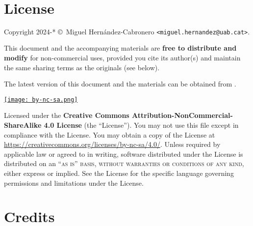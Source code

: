 
\newpage
~\vfill
\thispagestyle{empty}

\section*{License}

\noindent Copyright 2024-* \copyright\ Miguel Hernández-Cabronero \texttt{<miguel.hernandez@uab.cat>}.

\noindent This document and the accompanying materials are \textbf{free to distribute and modify} for non-commercial uses, 
provided you cite its author(s) and maintain the same sharing terms as the originals (see below).

\noindent The latest version of this document and the materials can be obtained from .

\begin{center}
\noindent\href{https://creativecommons.org/licenses/by-nc-sa/4.0/}{\texttt{[image: by-nc-sa.png]}}
\end{center}

\noindent Licensed under the \textbf{Creative Commons Attribution-NonCommercial-ShareAlike 4.0 License} (the ``License''). You may not use this file except in compliance with the License. You may obtain a copy of the License at \url{https://creativecommons.org/licenses/by-nc-sa/4.0/}. Unless required by applicable law or agreed to in writing, software distributed under the License is distributed on an \textsc{``as is'' basis, without warranties or conditions of any kind}, either express or implied. See the License for the specific language governing permissions and limitations under the License.\\ %

\section*{Credits}


